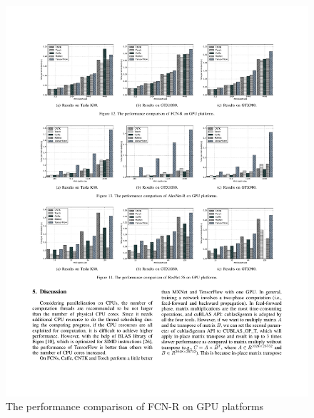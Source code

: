 \documentclass[11pt, oneside]{article}   	%
\begin{document}
\begin{figure}[htbp] 
	\includegraphics[width=\linewidth]{figures/FCN-R2.pdf} 
	\caption{The performance comparison of FCN-R on GPU platforms}
\end{figure}
%
\end{document}
